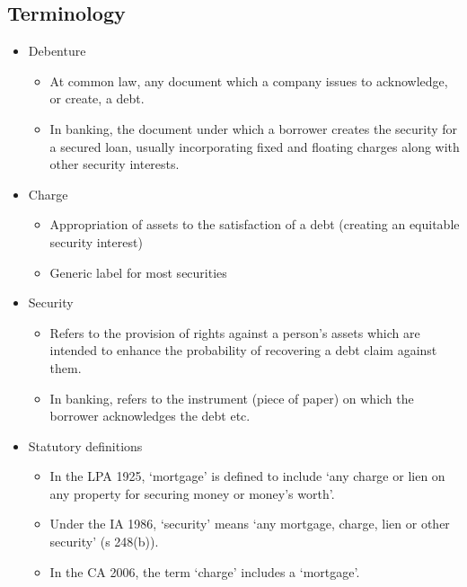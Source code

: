 \documentclass[
]{article}
\providecommand{\tightlist}{%
  \setlength{\itemsep}{0pt}\setlength{\parskip}{0pt}}
\begin{document}
\hypertarget{terminology}{%
\subsection{Terminology}\label{terminology}}

\begin{itemize}
\tightlist
\item
  Debenture

  \begin{itemize}
  \tightlist
  \item
    At common law, any document which a company issues to acknowledge,
    or create, a debt.
  \item
    In banking, the document under which a borrower creates the security
    for a secured loan, usually incorporating fixed and floating charges
    along with other security interests.
  \end{itemize}
\item
  Charge

  \begin{itemize}
  \tightlist
  \item
    Appropriation of assets to the satisfaction of a debt (creating an
    equitable security interest)
  \item
    Generic label for most securities
  \end{itemize}
\item
  Security

  \begin{itemize}
  \tightlist
  \item
    Refers to the provision of rights against a person's assets which
    are intended to enhance the probability of recovering a debt claim
    against them.
  \item
    In banking, refers to the instrument (piece of paper) on which the
    borrower acknowledges the debt etc.
  \end{itemize}
\item
  Statutory definitions

  \begin{itemize}
  \tightlist
  \item
    In the LPA 1925, `mortgage' is defined to include `any charge or
    lien on any property for securing money or money's worth'.
  \item
    Under the IA 1986, `security' means `any mortgage, charge, lien or
    other security' (s 248(b)).
  \item
    In the CA 2006, the term `charge' includes a `mortgage'.
  \end{itemize}
\end{itemize}
\end{document}
